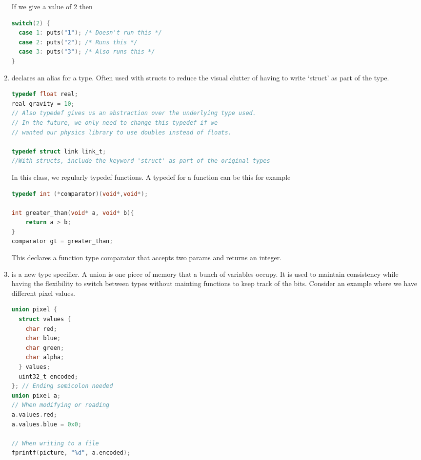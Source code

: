\begin{enumerate}
	      If we give a value of 2 then
	      \\
	      \begin{lstlisting}[language=C]
switch(2) {
  case 1: puts("1"); /* Doesn't run this */
  case 2: puts("2"); /* Runs this */
  case 3: puts("3"); /* Also runs this */
}
\end{lstlisting}

	\item {} declares an alias for a type. Often used with structs to reduce the visual clutter of having to write `struct' as part of the type.

	      \begin{lstlisting}[language=C]
typedef float real; 
real gravity = 10;
// Also typedef gives us an abstraction over the underlying type used. 
// In the future, we only need to change this typedef if we
// wanted our physics library to use doubles instead of floats.

typedef struct link link_t; 
//With structs, include the keyword 'struct' as part of the original types
\end{lstlisting}

	      In this class, we regularly typedef functions. A typedef for a function can be this for example

	      \begin{lstlisting}[language=C]
typedef int (*comparator)(void*,void*);

int greater_than(void* a, void* b){
    return a > b;
}
comparator gt = greater_than;
\end{lstlisting}

	      This declares a function type comparator that accepts two  params and returns an integer.

	\item {} is a new type specifier. A union is one piece of memory that a bunch of variables occupy. It is used to maintain consistency while having the flexibility to switch between types without mainting functions to keep track of the bits. Consider an example where we have different pixel values.
	      \begin{lstlisting}[language=C]
union pixel {
  struct values {
    char red;
    char blue;
    char green;
    char alpha;
  } values;
  uint32_t encoded;
}; // Ending semicolon needed
union pixel a;
// When modifying or reading
a.values.red;
a.values.blue = 0x0;

// When writing to a file
fprintf(picture, "%d", a.encoded);
\end{lstlisting}


\end{enumerate}
